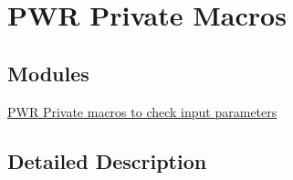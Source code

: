 \hypertarget{group___p_w_r___private___macros}{}\section{P\+WR Private Macros}
\label{group___p_w_r___private___macros}
\subsection*{Modules}
\begin{DoxyCompactItemize}
\item 
\hyperlink{group___p_w_r___i_s___p_w_r___definitions}{P\+W\+R Private macros to check input parameters}
\end{DoxyCompactItemize}


\subsection{Detailed Description}
